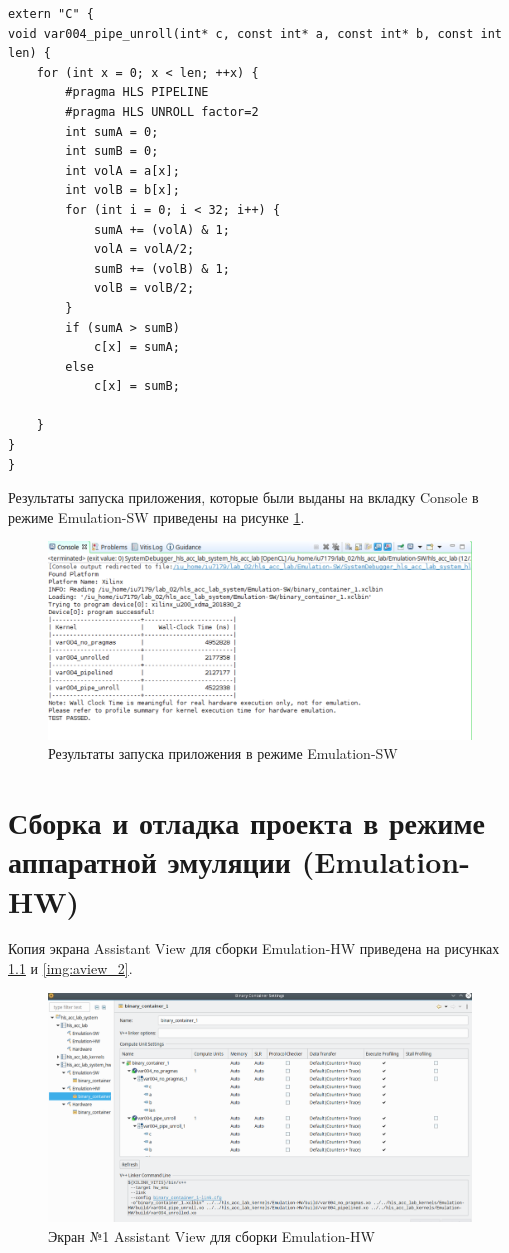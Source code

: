 \documentclass[12pt]{report}
\begin{document}
\begin{lstlisting}[label=lst:pipe_unroll,caption=Конвейерный и частично развернутый цикл]
extern "C" {
void var004_pipe_unroll(int* c, const int* a, const int* b, const int len) {
    for (int x = 0; x < len; ++x) {
        #pragma HLS PIPELINE
        #pragma HLS UNROLL factor=2
        int sumA = 0;
        int sumB = 0;
        int volA = a[x];
        int volB = b[x];
        for (int i = 0; i < 32; i++) {
            sumA += (volA) & 1;
            volA = volA/2;
            sumB += (volB) & 1;
            volB = volB/2;
        }
        if (sumA > sumB)
            c[x] = sumA;
        else
            c[x] = sumB;

    }
}
}
\end{lstlisting}
Результаты запуска приложения, которые были выданы на вкладку Console в режиме Emulation-SW приведены на рисунке \ref{img:test_sw}.
\begin{figure}[h!p]
	\centering
	\includegraphics[width = \linewidth]{test_sw.png}
	\caption{Результаты запуска приложения в режиме Emulation-SW}
	\label{img:test_sw}
\end{figure}

\chapter{Сборка и отладка проекта в режиме аппаратной эмуляции (Emulation-HW)}
Копия экрана Assistant View для сборки Emulation-HW приведена на рисунках \ref{img:aview_1} и \ref{img:aview_2}.
\begin{figure}[h!p]
	\centering
	\includegraphics[width = \linewidth]{aview_1.png}
	\caption{Экран №1 Assistant View для сборки Emulation-HW}
	\label{img:aview_1}
\end{figure}
\end{document}

